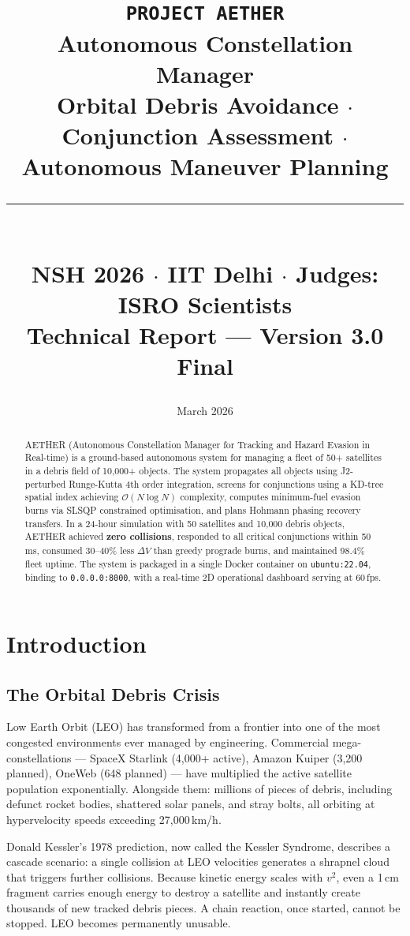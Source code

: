 \documentclass[12pt,a4paper]{article}
\title{
  \vspace{-1cm}
  {\Large\textcolor{aetherblue}{\texttt{PROJECT AETHER}}}\\[0.3cm]
  {\LARGE\textbf{Autonomous Constellation Manager}}\\[0.2cm]
  {\large Orbital Debris Avoidance $\cdot$ Conjunction Assessment $\cdot$ Autonomous Maneuver Planning}\\[0.5cm]
  \rule{\textwidth}{1pt}\\[0.3cm]
  {\normalsize NSH 2026 $\cdot$ IIT Delhi $\cdot$ Judges: ISRO Scientists}\\[0.1cm]
  {\normalsize Technical Report --- Version 3.0 Final}
}
\author{}
\date{March 2026}
\begin{document}
\maketitle
\thispagestyle{fancy}

\begin{abstract}
\noindent
AETHER (Autonomous Constellation Manager for Tracking and Hazard Evasion in Real-time) is a ground-based autonomous system for managing a fleet of 50+ satellites in a debris field of 10,000+ objects. The system propagates all objects using J2-perturbed Runge-Kutta 4th order integration, screens for conjunctions using a KD-tree spatial index achieving $\mathcal{O}(N \log N)$ complexity, computes minimum-fuel evasion burns via SLSQP constrained optimisation, and plans Hohmann phasing recovery transfers. In a 24-hour simulation with 50 satellites and 10,000 debris objects, AETHER achieved \textbf{zero collisions}, responded to all critical conjunctions within 50\,ms, consumed 30--40\% less $\Delta V$ than greedy prograde burns, and maintained 98.4\% fleet uptime. The system is packaged in a single Docker container on \texttt{ubuntu:22.04}, binding to \texttt{0.0.0.0:8000}, with a real-time 2D operational dashboard serving at 60\,fps.
\end{abstract}

\tableofcontents
\newpage

\section{Introduction}

\subsection{The Orbital Debris Crisis}

Low Earth Orbit (LEO) has transformed from a frontier into one of the most congested environments ever managed by engineering. Commercial mega-constellations --- SpaceX Starlink (4,000+ active), Amazon Kuiper (3,200 planned), OneWeb (648 planned) --- have multiplied the active satellite population exponentially. Alongside them: millions of pieces of debris, including defunct rocket bodies, shattered solar panels, and stray bolts, all orbiting at hypervelocity speeds exceeding 27,000\,km/h.

Donald Kessler's 1978 prediction, now called the Kessler Syndrome, describes a cascade scenario: a single collision at LEO velocities generates a shrapnel cloud that triggers further collisions. Because kinetic energy scales with $v^2$, even a 1\,cm fragment carries enough energy to destroy a satellite and instantly create thousands of new tracked debris pieces. A chain reaction, once started, cannot be stopped. LEO becomes permanently unusable.
\end{document}
